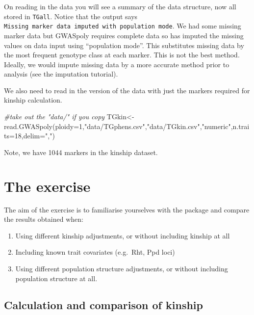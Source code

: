 \documentclass[
]{book}
\newenvironment{Shaded}{\begin{snugshade}}{\end{snugshade}}
\newcommand{\AttributeTok}[1]{\textcolor[rgb]{0.77,0.63,0.00}{#1}}
\newcommand{\CommentTok}[1]{\textcolor[rgb]{0.56,0.35,0.01}{\textit{#1}}}
\newcommand{\DecValTok}[1]{\textcolor[rgb]{0.00,0.00,0.81}{#1}}
\newcommand{\FunctionTok}[1]{\textcolor[rgb]{0.00,0.00,0.00}{#1}}
\newcommand{\NormalTok}[1]{#1}
\newcommand{\OtherTok}[1]{\textcolor[rgb]{0.56,0.35,0.01}{#1}}
\newcommand{\StringTok}[1]{\textcolor[rgb]{0.31,0.60,0.02}{#1}}
\providecommand{\tightlist}{%
  \setlength{\itemsep}{0pt}\setlength{\parskip}{0pt}}
\begin{document}
On reading in the data you will see a summary of the data structure, now all stored in \texttt{TGall}. Notice that the output says \texttt{Missing\ marker\ data\ imputed\ with\ population\ mode}. We had some missing marker data but GWASpoly requires complete data so has imputed the missing values on data input using ``population mode''. This substitutes missing data by the most frequent genotype class at each marker. This is not the best method. Ideally, we would impute missing data by a more accurate method prior to analysis (see the imputation tutorial).

We also need to read in the version of the data with just the markers required for kinship calculation.

\begin{Shaded}
\begin{Highlighting}[]
\CommentTok{\#take out the "data/" if you copy}
\NormalTok{TGkin}\OtherTok{\textless{}{-}}\FunctionTok{read.GWASpoly}\NormalTok{(}\AttributeTok{ploidy=}\DecValTok{1}\NormalTok{,}\StringTok{"data/TGphens.csv"}\NormalTok{,}\StringTok{"data/TGkin.csv"}\NormalTok{,}\StringTok{"numeric"}\NormalTok{,}\AttributeTok{n.traits=}\DecValTok{18}\NormalTok{,}\AttributeTok{delim=}\StringTok{","}\NormalTok{)}
\end{Highlighting}
\end{Shaded}

Note, we have 1044 markers in the kinship dataset.

\hypertarget{the-exercise-2}{%
\section{The exercise}\label{the-exercise-2}}

The aim of the exercise is to familiarise yourselves with the package and compare the results obtained when:

\begin{enumerate}
\def\labelenumi{\alph{enumi})}
\tightlist
\item
  Using different kinship adjustments, or without including kinship at all
\item
  Including known trait covariates (e.g.~Rht, Ppd loci)
\item
  Using different population structure adjustments, or without including population structure at all.
\end{enumerate}

\hypertarget{calculation-and-comparison-of-kinship}{%
\subsection{Calculation and comparison of kinship}\label{calculation-and-comparison-of-kinship}}
\end{document}

